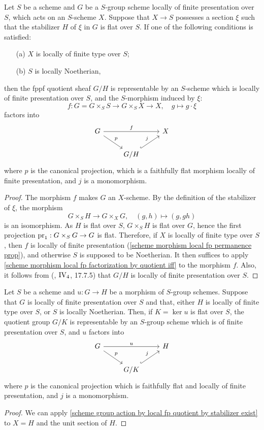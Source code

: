 \begin{theorem}\label{scheme group action by local fp quotient by stabilizer exist}
Let $S$ be a scheme and $G$ be a $S$-group scheme locally of finite presentation over $S$, which acts on an $S$-scheme $X$. Suppose that $X\to S$ possesses a section $\xi$ such that the stabilizer $H$ of $\xi$ in $G$ is flat over $S$. If one of the following conditions is satisfied:
\begin{enumerate}
    \item[(a)] $X$ is locally of finite type over $S$;
    \item[(b)] $S$ is locally Noetherian,
\end{enumerate}
then the fppf quotient sheaf $G/H$ is representable by an $S$-scheme which is locally of finite presentation over $S$, and the $S$-morphism induced by $\xi$:
\[f:G=G\times_SS\to G\times_SX\to X,\quad g\mapsto g\cdot\xi\]
factors into
\[\begin{tikzcd}
G\ar[rd,"p"]\ar[rr,"f"]&&X\\
&G/H\ar[ru,hook,"j"]&
\end{tikzcd}\]
where $p$ is the canonical projection, which is a faithfully flat morphism locally of finite presentation, and $j$ is a monomorphism.
\end{theorem}
\begin{proof}
The morphism $f$ makes $G$ an $X$-scheme. By the definition of the stabilizer of $\xi$, the morphism
\[G\times_SH\to G\times_XG,\quad (g,h)\mapsto (g,gh)\]
is an isomorphism. As $H$ is flat over $S$, $G\times_SH$ is flat over $G$, hence the first projection $\mathrm{pr}_1:G\times_SG\to G$ is flat. Therefore, if $X$ is locally of finite type over $S$, then $f$ is locally of finite presentation (\cref{scheme morphism local fp permanence prop}), and otherwise $S$ is supposed to be Noetherian. It then suffices to apply \cref{scheme morphism local fp factorization by quotient iff} to the morphism $f$. Also, it follows from (\cite{EGA4}, $\text{\Rmnum{4}}_4$, 17.7.5) that $G/H$ is locally of finite presentation over $S$.
\end{proof}

\begin{corollary}\label{scheme group morphism factorization by quotient if flat}
Let $S$ be a scheme and $u:G\to H$ be a morphism of $S$-group schemes. Suppose that $G$ is locally of finite presentation over $S$ and that, either $H$ is locally of finite type over $S$, or $S$ is locally Noetherian. Then, if $K=\ker u$ is flat over $S$, the quotient group $G/K$ is representable by an $S$-group scheme which is of finite presentation over $S$, and $u$ factors into
\[\begin{tikzcd}
G\ar[rd,"p"]\ar[rr,"u"]&&H\\
&G/K\ar[ru,hook,"j"]&
\end{tikzcd}\]
where $p$ is the canonical projection which is faithfully flat and locally of finite presentation, and $j$ is a monomorphism.
\end{corollary}
\begin{proof}
We can apply \cref{scheme group action by local fp quotient by stabilizer exist} to $X=H$ and the unit section of $H$.
\end{proof}

